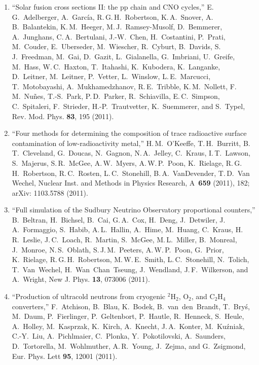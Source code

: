 \begin{enumerate} %

\item ``Solar fusion cross sections II: the pp chain and CNO cycles,'' E.\,G.~Adelberger, A.~Garc\'{i}a, R.\,G.\,H.~Robertson, K.\,A.~Snover, A.\,B.~Balantekin, K.\,M.~Heeger, M.\,J.~Ramsey-Musolf, D.~Bemmerer, A.~Junghans, C.\,A.~Bertulani, J.-W.~Chen, H.~Costantini, P.~Prati, M.~Couder, E.~Uberseder, M.~Wiescher, R.~Cyburt,  B.~Davids, S.\,J.~Freedman, M.~Gai, D.~Gazit, L.~Gialanella, G.~Imbriani, U.~Greife, M.~Hass, W.\,C.~Haxton, T.~Itahashi, K.~Kubodera, K.~Langanke, D.~Leitner, M.~Leitner, P.~Vetter, L.~Winslow, L.\,E.~Marcucci, T.~Motobayashi, A.~Mukhamedzhanov, R.\,E.~Tribble, K.\,M.~Nollett, F.\,M.~Nu\~{n}es, T.-S.~Park, P.\,D.~Parker, R.~Schiavilla, E.\,C.~Simpson, C.~Spitaleri, F.~Strieder, H.-P.~Trautvetter, K.~Suemmerer, and S.~Typel,  Rev. Mod. Phys. {\bf 83}, 195 (2011).\DOEsupport

\item ``Four methods for determining the composition of trace radioactive surface contamination of low-radioactivity metal,''  H.\,M.~O'Keeffe, T.\,H.~Burritt, B.\,T.~Cleveland, G.~Doucas, N.~Gagnon, N.\,A.~Jelley, C.~Kraus, I.\,T.~Lawson, S.~Majerus, S.\,R.~McGee, A.\,W.~Myers, A.\,W.\,P.~Poon, K.~Rielage, R.\,G.\,H.~Robertson, R.\,C.~Rosten, L.\,C.~Stonehill, B.\,A.~VanDevender\leadauthor, T.\,D.~Van Wechel, Nuclear Inst. and Methods in Physics Research, A~{\bf 659} (2011), 182; arXiv: 1103.5788 (2011).\DOEsupport

\item ``Full simulation of the Sudbury Neutrino Observatory proportional counters,'' B.~Beltran, H.~Bichsel, B.~Cai, G.\,A.~Cox, H.~Deng, J.~Detwiler, J.\,A.~Formaggio, S.~Habib, A.\,L.~Hallin, A.~Hime, M.~Huang, C.~Kraus, H.\,R.~Leslie, J.\,C.~Loach, R.~Martin, S.~McGee, M.\,L.~Miller, B.~Monreal, J.~Monroe, N.\,S.~Oblath\leadauthor, S.\,J.\,M.~Peeters, A.\,W.\,P.~Poon, G.~Prior, K.~Rielage, R.\,G.\,H.~Robertson, M.\,W.\,E.~Smith, L.\,C.~Stonehill, N.~Tolich, T.~Van~Wechel, H.~Wan~Chan~Tseung, J.~Wendland, J.\,F.~Wilkerson, and A.~Wright, New J. Phys. {\bf 13}, 073006 (2011).\DOEsupport

\item ``Production of ultracold neutrons from cryogenic $^2$H$_2$, O$_2$, and C$_2$H$_4$ converters,'' F.~Atchison, B.~Blau, K.~Bodek, B.~van~den~Brandt, T.~Bry\'{s}, M.~Daum, P.~Fierlinger, P.~Geltenbort, P.~Hautle, R.~Henneck, S.~Heule, A.~Holley, M.~Kasprzak, K.~Kirch, A.~Knecht, J.\,A.~Konter, M.~Ku\'{z}niak, C.-Y.~Liu, A.~Pichlmaier, C.~Plonka, Y.~Pokotilovski, A.~Saunders, D.~Tortorella, M.~Wohlmuther, A.\,R.~Young, J.~Zejma, and G.~Zsigmond, Eur. Phys. Lett {\bf 95}, 12001 (2011).


\end{enumerate}
